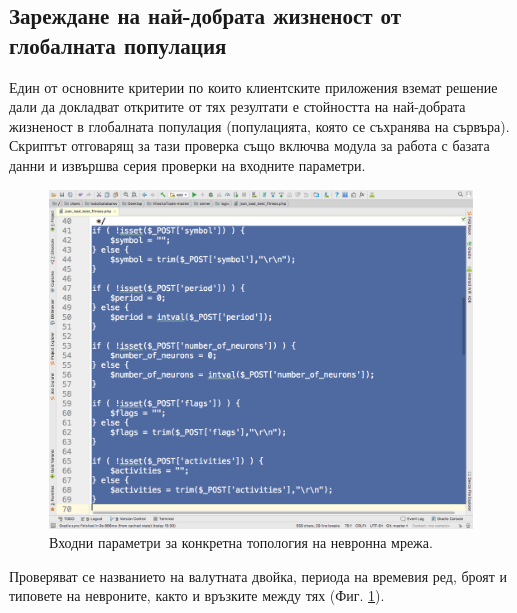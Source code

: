 \documentclass[book,14pt,oneside,openany]{memoir}
\begin{document}
\subsection{Зареждане на най-добрата жизненост от глобалната популация}

Един от основните критерии по които клиентските приложения вземат решение дали да докладват откритите от тях резултати е стойността на най-добрата жизненост в глобалната популация (популацията, която се съхранява на сървъра). Скриптът отговарящ за тази проверка също включва модула за работа с базата данни и извършва серия проверки на входните параметри. 

\begin{figure}[h]
  \centering
  \includegraphics[height=0.45\pdfpageheight]{pic0122}
  \caption{Входни параметри за конкретна топология на невронна мрежа.}
\label{fig:pic0122}
\end{figure}
\FloatBarrier

Проверяват се названието на валутната двойка, периода на времевия ред, броят и типовете на невроните, както и връзките между тях (Фиг. \ref{fig:pic0122}).
\end{document}
